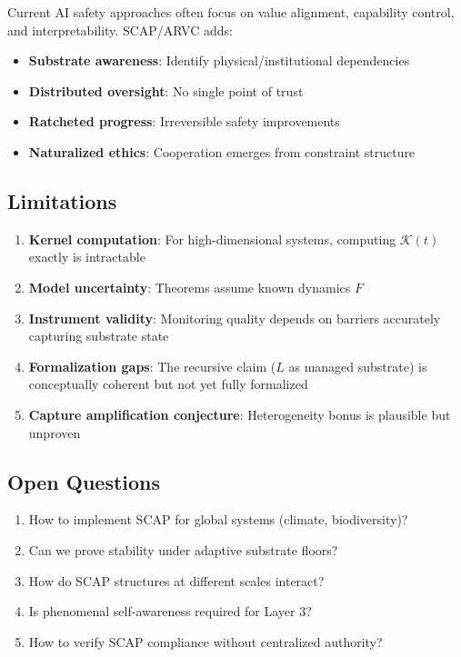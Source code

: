 \documentclass[11pt,a4paper]{article}
\theoremstyle{definition}
\newcommand{\K}{\mathcal{K}}
\begin{document}
Current AI safety approaches often focus on value alignment, capability control, and interpretability. SCAP/ARVC adds:
\begin{itemize}
\item \textbf{Substrate awareness}: Identify physical/institutional dependencies
\item \textbf{Distributed oversight}: No single point of trust
\item \textbf{Ratcheted progress}: Irreversible safety improvements
\item \textbf{Naturalized ethics}: Cooperation emerges from constraint structure
\end{itemize}

\subsection{Limitations}

\begin{enumerate}
\item \textbf{Kernel computation}: For high-dimensional systems, computing $\K(t)$ exactly is intractable
\item \textbf{Model uncertainty}: Theorems assume known dynamics $F$
\item \textbf{Instrument validity}: Monitoring quality depends on barriers accurately capturing substrate state
\item \textbf{Formalization gaps}: The recursive claim ($L$ as managed substrate) is conceptually coherent but not yet fully formalized
\item \textbf{Capture amplification conjecture}: Heterogeneity bonus is plausible but unproven
\end{enumerate}

\subsection{Open Questions}

\begin{enumerate}
\item How to implement SCAP for global systems (climate, biodiversity)?
\item Can we prove stability under adaptive substrate floors?
\item How do SCAP structures at different scales interact?
\item Is phenomenal self-awareness required for Layer 3?
\item How to verify SCAP compliance without centralized authority?
\end{enumerate}
\end{document}
